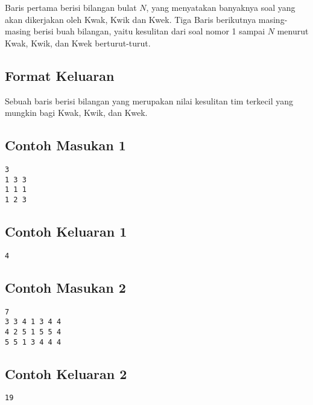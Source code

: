 \documentclass{article}
\begin{document}
Baris pertama berisi bilangan bulat $N$, yang menyatakan banyaknya soal yang akan dikerjakan oleh Kwak, Kwik dan Kwek.
Tiga Baris berikutnya masing-masing berisi  buah bilangan, yaitu kesulitan dari soal nomor 1 sampai $N$ menurut Kwak, Kwik, dan Kwek berturut-turut.

\subsection*{Format Keluaran}
Sebuah baris berisi bilangan yang merupakan nilai kesulitan tim terkecil yang mungkin bagi Kwak, Kwik, dan Kwek.
\\

\begin{multicols}{2}
\subsection*{Contoh Masukan 1}
\begin{lstlisting}
3
1 3 3
1 1 1
1 2 3
\end{lstlisting}
\columnbreak
\subsection*{Contoh Keluaran 1}
\begin{lstlisting}
4
\end{lstlisting}
\vfill
\null
\end{multicols}

\begin{multicols}{2}
\subsection*{Contoh Masukan 2}
\begin{lstlisting}
7
3 3 4 1 3 4 4
4 2 5 1 5 5 4
5 5 1 3 4 4 4
\end{lstlisting}
\columnbreak
\subsection*{Contoh Keluaran 2}
\begin{lstlisting}
19
\end{lstlisting}
\vfill
\null
\end{multicols}


\pagebreak
\end{document}
